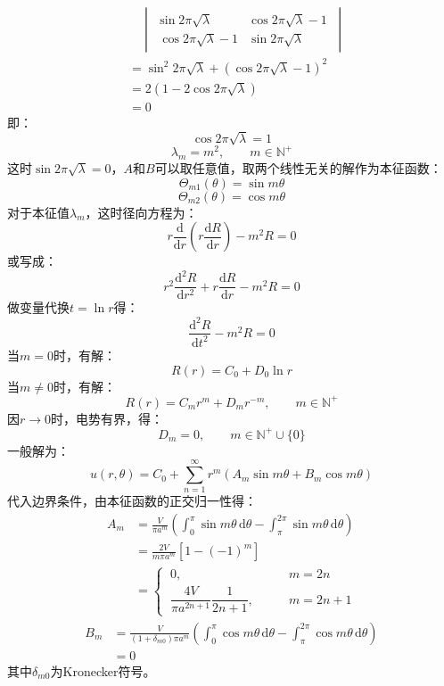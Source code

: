 \documentclass[fontset=windows]{ctexart}
\begin{document}
\begin{itemize}
    \begin{align*}
    &\quad
    \begin{vmatrix}
        \sin2\pi\sqrt{\lambda} & \cos2\pi\sqrt{\lambda} - 1 \ \\
        \ \cos2\pi\sqrt{\lambda} - 1 & \sin2\pi\sqrt{\lambda}
    \end{vmatrix} \\
    &= \sin^2{2\pi\sqrt{\lambda}} + \left(\cos2\pi\sqrt{\lambda} - 1\right)^2 \\
    &= 2\left(1 - 2\cos2\pi\sqrt{\lambda}\right) \\
    &= 0
    \end{align*}
    即：
    \[
    \cos2\pi\sqrt{\lambda} = 1
    \]
    \[
    \lambda_m = m^2,\qquad
    m\in\mathbb{N^+}
    \]
    这时$\sin2\pi\sqrt{\lambda} = 0$，$A$和$B$可以取任意值，取两个线性无关的解作为本征函数：
    \[
    \varTheta_{m1}(\theta) = \sin m\theta
    \]
    \[
    \varTheta_{m2}(\theta) = \cos m\theta
    \]
    对于本征值$\lambda_m$，这时径向方程为：
    \[
    r\frac{\mathrm{d}}{\mathrm{d}r}\left(r\frac{\mathrm{d}R}{\mathrm{d} r}\right) - m^2 R = 0
    \]
    或写成：
    \[
    r^2\frac{\mathrm{d}^2 R}{\mathrm{d}r^2} + r\frac{\mathrm{d}R}{\mathrm{d}r} - m^2 R = 0
    \]
    做变量代换$t = \ln r$得：
    \[
    \frac{\mathrm{d}^2 R}{\mathrm{d}t^2} - m^2 R = 0
    \]
    当$m = 0$时，有解：
    \[
    R(r) = C_0 + D_0\ln r
    \]
    当$m \neq 0$时，有解：
    \[
    R(r) = C_m r^m + D_m r^{-m},\qquad
    m \in \mathbb{N^+}
    \]
    因$r\to0$时，电势有界，得：
    \[
    D_m = 0,\qquad
    m \in \mathbb{N^+}\cup\{0\}
    \]
    一般解为：
    \[
    u(r,\theta) = C_0 + \sum_{n = 1}^{\infty}r^{m}\left(A_m\sin{m\theta} + B_m\cos{m\theta}\right)
    \]
    代入边界条件，由本征函数的正交归一性得：
    \begin{align*}
    A_m
    &= \frac{V}{\pi a^m}\left(\int_{0}^{\pi}\sin{m\theta}\,\mathrm{d}\theta - \int_{\pi}^{2\pi}\sin{m\theta}\,\mathrm{d}\theta\right) \\
    &= \frac{2V}{m\pi a^m}[1-(-1)^m] \\
    &= \left\{
        \begin{matrix}
            \ 0,\qquad & m = 2n \\
            \ \dfrac{4V}{\pi a^{2n+1}}\dfrac{1}{2n+1},\qquad & m = 2n+1
        \end{matrix}
       \right.
    \end{align*}
    \begin{align*}
    B_m
    &= \frac{V}{(1+\delta_{m0})\pi a^m}\left(\int_{0}^{\pi}\cos{m\theta}\,\mathrm{d}\theta - \int_{\pi}^{2\pi}\cos{m\theta}\,\mathrm{d}\theta\right) \\
    &= 0
    \end{align*}
    其中$\delta_{m0}$为Kronecker符号。


\end{itemize}
\end{document}
